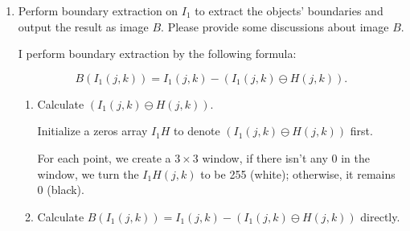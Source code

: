 \documentclass{article}
\begin{document}
    \begin{enumerate}[label=(\alph*)]
        \item Perform boundary extraction on $I_1$ to extract the objects' boundaries and output the result as image $B$. Please provide some discussions about image $B$.

        I perform boundary extraction by the following formula:

        $$B(I_1(j, k)) = I_1(j, k) - (I_1(j, k) \ominus H(j, k)).$$

        \begin{enumerate}[label=(\roman*)]
            \item Calculate $(I_1(j, k) \ominus H(j, k))$.

                Initialize a zeros array $I_1H$ to denote $(I_1(j, k) \ominus H(j, k))$ first.
                
                For each point, we create a $3 \times 3$ window, if there isn't any $0$ in the window, we turn the $I_1H(j, k)$ to be 255 (white); otherwise, it remains 0 (black).

            \item Calculate $B(I_1(j, k)) = I_1(j, k) - (I_1(j, k) \ominus H(j, k))$ directly.
        \end{enumerate}


\end{enumerate}
\end{document}
